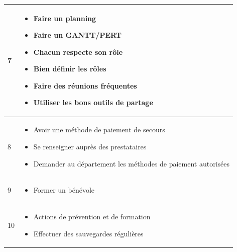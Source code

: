 \begin{longtable}{|p{7cm}|p{7cm}|}
	7 & \begin{itemize}

		\item Faire un planning

		\item Faire un GANTT/PERT

		\item Chacun respecte son rôle

		\item Bien définir les rôles

		\item Faire des réunions fréquentes

		\item Utiliser les bons outils de partage

	\end{itemize} \\

	\hline

	8 & \begin{itemize}

		\item Avoir une méthode de paiement de secours

		\item Se renseigner auprès des prestataires

		\item Demander au département les méthodes de paiement autorisées

	\end{itemize} \\

	\hline

	9 & \begin{itemize}

		\item Former un bénévole

	\end{itemize} \\

	\hline

	10 & \begin{itemize}

		\item Actions de prévention et de formation

		\item Effectuer des sauvegardes régulières

	\end{itemize} \\

	\hline

	\end{longtable}


